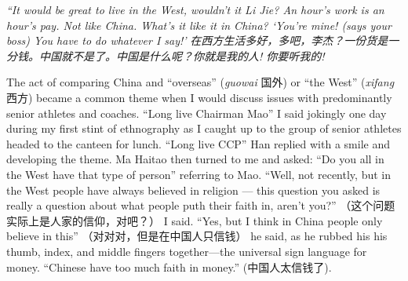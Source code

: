 \textit{``It would be great to live in the West, wouldn’t it Li Jie?  An hour’s work is an hour’s pay.  Not like China.  What’s it like it in China?  `You’re mine! (says your boss) You have to do whatever I say!'}
 \textit{在西方生活多好，多吧，李杰？一份货是一分钱。中国就不是了。中国是什么呢？你就是我的人! 你要听我的!}

The act of comparing China and ``overseas'' (\textit{guowai} 国外) or ``the West'' (\textit{xifang} 西方) became a common theme when I would discuss issues with predominantly senior athletes and coaches.
``Long live Chairman Mao'' I said jokingly one day during my first stint of ethnography as I caught up to the group of senior athletes headed to the canteen for lunch.  ``Long live CCP'' Han replied with a smile and developing the theme.  Ma Haitao then turned to me and asked: ``Do you all in the West have that type of person'' referring to Mao.  ``Well, not recently, but in the West people have always believed in religion --- this question you asked is really a question about what people puth their faith in, aren't you?'' （这个问题实际上是人家的信仰，对吧？） I said.  ``Yes, but I think in China people only believe in this'' （对对对，但是在中国人只信钱） he said, as he rubbed his his thumb, index, and middle fingers together---the universal sign language for money. ``Chinese have too much faith in money.'' (中国人太信钱了).

